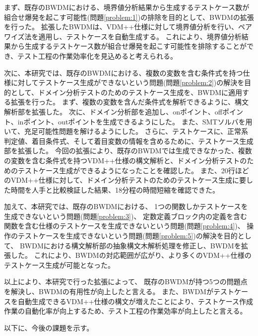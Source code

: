 \documentclass[uplatex, report, a4j, 10pt]{jsbook}
\begin{document}
まず、既存のBWDMにおける、境界値分析結果から生成するテストケース数が組合せ爆発を起こす可能性(問題\ref{problem:1})の排除を目的として、BWDMの拡張を行った。
拡張したBWDMは、VDM++仕様に対して境界値分析を行い、ペアワイズ法を適用し、テストケースを自動生成する。
これにより、境界値分析結果から生成するテストケース数が組合せ爆発を起こす可能性を排除することができ、テスト工程の作業効率化を見込めると考えられる。

次に、本研究では、既存のBWDMにおける、複数の変数を含む条件式を持つ仕様に対してテストケース生成ができないという問題(問題\ref{problem:2})の解決を目的として、ドメイン分析テストのためのテストケース生成を、BWDMに適用する拡張を行った。
まず、複数の変数を含んだ条件式を解析できるように、構文解析部を拡張した。
次に、ドメイン分析部を追加し、onポイント、offポイント、inポイント、outポイントを生成できるようにした。
また、SMTソルバを用いて、充足可能性問題を解けるようにした。
さらに、テストケースに、正常系判定値、着目条件式、そして着目変数の情報を含めるために、テストケース生成部を拡張した。
今回の拡張により、既存のBWDMでは生成できなかった、複数の変数を含む条件式を持つVDM++仕様の構文解析と、ドメイン分析テストのためのテストケース生成ができるようになったことを確認した。
また、20行ほどのVDM++仕様に対して、ドメイン分析テストのためのテストケース生成に要した時間を人手と比較検証した結果、18分程の時間短縮を確認できた。

加えて、本研究では、既存のBWDMにおける、
1つの関数しかテストケースを生成できないという問題(問題\ref{problem:3})、
定数定義ブロック内の定義を含む関数を含む仕様のテストケースを生成できないという問題(問題\ref{problem:4})、
操作のテストケースを生成できないという問題(問題\ref{problem:5})の解決を目的として、
BWDMにおける構文解析部の抽象構文木解析処理を修正し、BWDMを拡張した。
これにより、BWDMの対応範囲が広がり、より多くのVDM++仕様のテストケース生成が可能となった。

以上により、本研究で行った拡張によって、
既存のBWDMが持つ5つの問題点を解決し、BWDMの有用性が向上したと言える。
また、BWDMがテストケースを自動生成できるVDM++仕様の構文が増えたことにより、テストケース作成作業の自動化率が向上するため、テスト工程の作業効率が向上したと言える。

以下に、今後の課題を示す。
\end{document}
